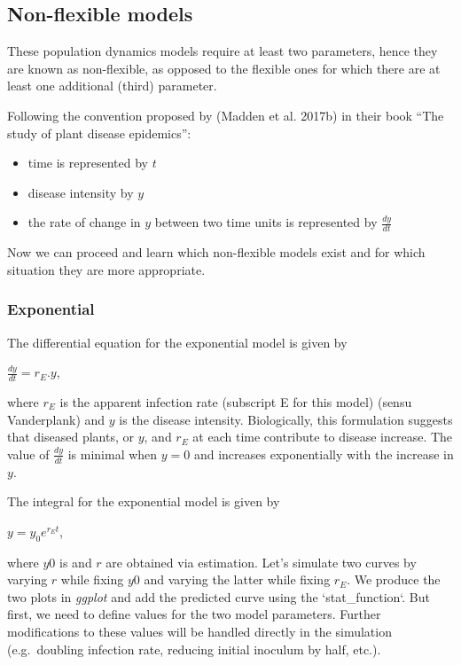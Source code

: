 \documentclass[
  letterpaper,
  DIV=11,
  numbers=noendperiod]{scrreprt}
\begin{document}
\hypertarget{non-flexible-models}{%
\subsection{Non-flexible models}\label{non-flexible-models}}

These population dynamics models require at least two parameters, hence
they are known as non-flexible, as opposed to the flexible ones for
which there are at least one additional (third) parameter.

Following the convention proposed by (Madden et al. 2017b) in their book
``The study of plant disease epidemics'':

\begin{itemize}
\item
  time is represented by \(t\)
\item
  disease intensity by \(y\)
\item
  the rate of change in \(y\) between two time units is represented by
  \(\frac{dy}{dt}\)
\end{itemize}

Now we can proceed and learn which non-flexible models exist and for
which situation they are more appropriate.

\hypertarget{exponential}{%
\subsubsection{Exponential}\label{exponential}}

The differential equation for the exponential model is given by

\(\frac{dy}{dt} = r_E.y\),

where \(r_E\) is the apparent infection rate (subscript E for this
model) (sensu Vanderplank) and \(y\) is the disease intensity.
Biologically, this formulation suggests that diseased plants, or \(y\),
and \(r_E\) at each time contribute to disease increase. The value of
\(\frac{dy}{dt}\) is minimal when \(y = 0\) and increases exponentially
with the increase in \(y\).

The integral for the exponential model is given by

\(y = y_0 e^{r_Et}\),

where \(y0\) is and \(r\) are obtained via estimation. Let's simulate
two curves by varying \(r\) while fixing \(y0\) and varying the latter
while fixing \(r_E\). We produce the two plots in \emph{ggplot} and add
the predicted curve using the `stat\_function`. But first, we need to
define values for the two model parameters. Further modifications to
these values will be handled directly in the simulation (e.g.~doubling
infection rate, reducing initial inoculum by half, etc.).
\end{document}
